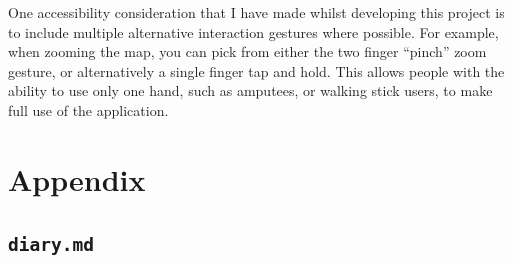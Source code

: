 \documentclass[hyphens]{final_report}
\begin{document}
One accessibility consideration that I have made whilst developing this project is to include multiple alternative interaction gestures where possible. For example, when zooming the map, you can pick from either the two finger ``pinch'' zoom gesture, or alternatively a single finger tap and hold. This allows people with the ability to use only one hand, such as amputees, or walking stick users, to make full use of the application.






\clearpage
\chapter{Appendix}

\section{\texttt{diary.md}}



\clearpage
{}

\renewcommand*{\bibfont}{\normalfont\small}
\printbibliography{}
\end{document}
